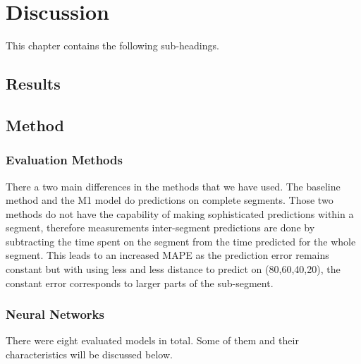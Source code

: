 
\chapter{Discussion}
\label{cha:discussion}

This chapter contains the following sub-headings.

\section{Results}
\label{sec:discussion-results}


\section{Method}
\label{sec:discussion-method}
\subsection{Evaluation Methods}
There a two main differences in the methods that we have used. The baseline method and the M1 model do predictions on complete segments. Those two methods do not have the capability of making sophisticated predictions within a segment, therefore measurements inter-segment predictions are done by subtracting the time spent on the segment from the time predicted for the whole segment. This leads to an increased MAPE as the prediction error remains constant but with using less and less distance to predict on (80,60,40,20), the constant error corresponds to larger parts of the sub-segment.

\subsection{Neural Networks}
There were eight evaluated models in total. Some of them and their characteristics will be discussed below.

